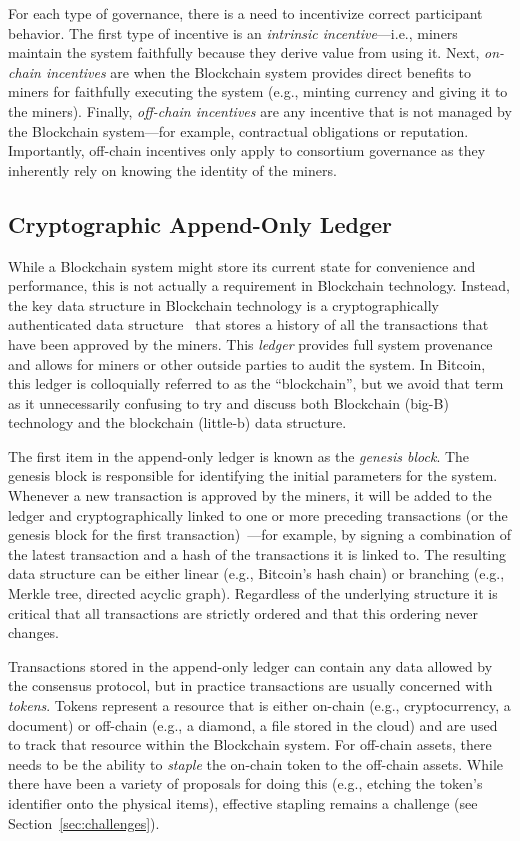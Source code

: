 For each type of governance, there is a need to incentivize correct participant behavior.
The first type of incentive is an \emph{intrinsic incentive}---i.e., miners maintain the system faithfully because they derive value from using it.
Next, \emph{on-chain incentives} are when the Blockchain system provides direct benefits to miners for faithfully executing the system (e.g., minting currency and giving it to the miners).
Finally, \emph{off-chain incentives} are any incentive that is not managed by the Blockchain system---for example, contractual obligations or reputation.
Importantly, off-chain incentives only apply to consortium governance as they inherently rely on knowing the identity of the miners.

\subsection{Cryptographic Append-Only Ledger}
While a Blockchain system might store its current state for convenience and performance, this is not actually a requirement in Blockchain technology.
Instead, the key data structure in Blockchain technology is a cryptographically authenticated data structure~\cite{tamassia2003authenticated} that stores a history of all the transactions that have been approved by the miners.
This \emph{ledger} provides full system provenance and allows for miners or other outside parties to audit the system.
In Bitcoin, this ledger is colloquially referred to as the ``blockchain'', but we avoid that term as it unnecessarily confusing to try and discuss both Blockchain (big-B) technology and the blockchain (little-b) data structure.

The first item in the append-only ledger is known as the \emph{genesis block}.
The genesis block is responsible for identifying the initial parameters for the system.
Whenever a new transaction is approved by the miners, it will be added to the ledger and cryptographically linked to one or more preceding transactions (or the genesis block for the first transaction)~\cite{bayer1993improving,haber1990time,haber1997secure}---for example, by signing a combination of the latest transaction and a hash of the transactions it is linked to.
The resulting data structure can be either linear (e.g., Bitcoin's hash chain) or branching (e.g., Merkle tree, directed acyclic graph).
Regardless of the underlying structure it is critical that all transactions are strictly ordered and that this ordering never changes.

Transactions stored in the append-only ledger can contain any data allowed by the consensus protocol, but in practice transactions are usually concerned with \emph{tokens}.
Tokens represent a resource that is either on-chain (e.g., cryptocurrency, a document) or off-chain (e.g., a diamond, a file stored in the cloud) and are used to track that resource within the Blockchain system.
For off-chain assets, there needs to be the ability to \emph{staple} the on-chain token to the off-chain assets.
While there have been a variety of proposals for doing this (e.g., etching the token's identifier onto the physical items), effective stapling remains a challenge (see Section~\ref{sec:challenges}).

